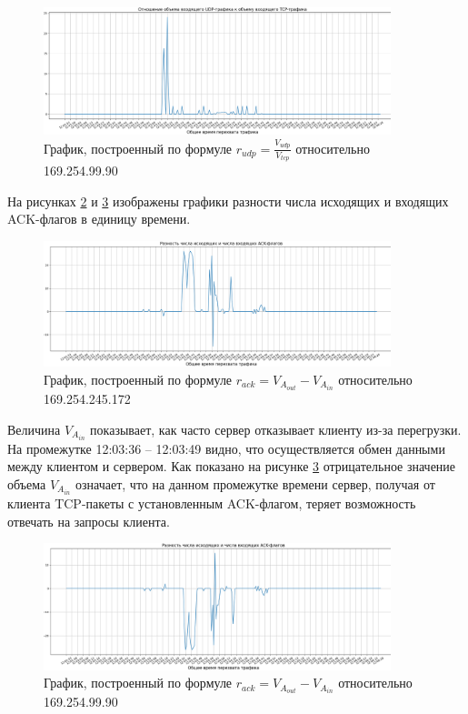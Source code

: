 \documentclass[bachelor, och, coursework]{SCWorks}
\begin{document}
  \begin{figure}[H]
    \centering
    \includegraphics[width=0.9\textwidth]{photo/serv2.png}
    \caption{График, построенный по формуле $r_{udp} = \frac{V_{udp}}{V_{tcp}}$ относительно 169.254.99.90}
    \label{serv2}
  \end{figure}

  На рисунках \ref{clnt3} и \ref{serv3} изображены графики разности числа исходящих и входящих ACK-флагов в единицу времени.

  \begin{figure}[H]
    \centering
    \includegraphics[width=0.9\textwidth]{photo/clnt3.png}
    \caption{График, построенный по формуле $r_{ack} = V_{A_{out}} - V_{A_{in}}$ относительно 169.254.245.172}
    \label{clnt3}
  \end{figure}

  Величина $V_{A_{in}}$ показывает, как часто сервер отказывает клиенту из-за перегрузки. На промежутке 12:03:36 -- 12:03:49 видно, что 
  осуществляется обмен данными между клиентом и сервером. Как показано на рисунке \ref{serv3} отрицательное значение объема $V_{A_{in}}$
  означает, что на данном промежутке времени сервер, получая от клиента TCP-пакеты с установленным ACK-флагом, теряет возможность
  отвечать на запросы клиента. 

  \begin{figure}[H]
    \centering
    \includegraphics[width=0.9\textwidth]{photo/serv3.png}
    \caption{График, построенный по формуле $r_{ack} = V_{A_{out}} - V_{A_{in}}$ относительно 169.254.99.90}
    \label{serv3}
  \end{figure}
\end{document}

